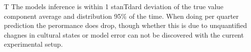T
The models inference is within 1 stanTdard deviation of the true value component average and distribution 95\% of the time. When doing per quarter prediction the perormance does drop, though whether this is due to unquantified chagnes in cultural states or model error can not be discovered with the current experimental setup.
